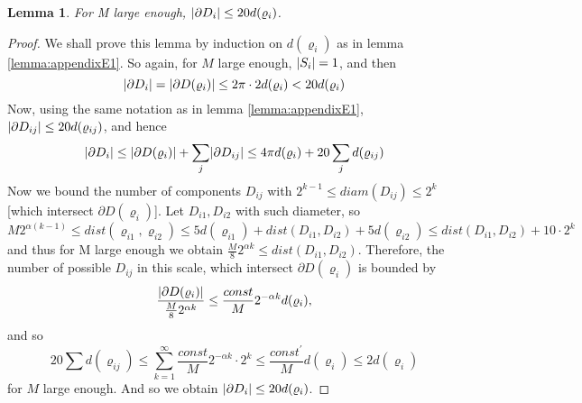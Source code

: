\documentclass[11pt,reqno]{article}
\DeclarePairedDelimiter\abs{\lvert}{\rvert}%
\newtheorem{lemma}[thm]{Lemma}
\theoremstyle{definition}
\numberwithin{equation}{section}
\begin{document}
\begin{lemma} \label{lemma:appendixE2}
For M large enough, $\abs{\partial D_i} \leq 20 d(\varrho_i)$.
\end{lemma}

\begin{proof}
We shall prove this lemma by induction on $d(\varrho_i)$ as in lemma \eqref{lemma:appendixE1}. So again, for $M$ large enough, $\abs{S_i} = 1$, and then
$$
\abs{\partial D_i} = \abs{\partial D(\varrho_i)} \leq 2\pi\cdot 2d(\varrho_i) < 20d(\varrho_i)
$$
Now, using the same notation as in lemma \eqref{lemma:appendixE1}, $\abs{\partial D_{ij}} \leq 20 d(\varrho_{ij})$, and hence
$$
\abs{\partial D_i} \leq \abs{\partial D(\varrho_i)} + \sum_j \abs{\partial D_{ij}} \leq
4\pi d(\varrho_i) + 20 \sum_j d(\varrho_{ij})
$$
Now we bound the number of components $D_{ij}$ with $2^{k-1} \leq diam(D_{ij}) \leq 2^k$ [which intersect $\partial D(\varrho_i)$]. Let $D_{i1}, D_{i2}$ with such diameter, so
$$
M2^{\alpha(k-1)} \leq dist(\varrho_{i1}, \varrho_{i2}) \leq 5d(\varrho_{i1}) + dist(D_{i1}, D_{i2}) + 5d(\varrho_{i2}) \leq dist(D_{i1}, D_{i2}) + 10 \cdot 2^k
$$
and thus for M large enough we obtain $\frac{M}{8}2^{\alpha k} \leq dist(D_{i1}, D_{i2})$. Therefore, the number of possible $D_{ij}$ in this scale, which intersect $\partial D(\varrho_i)$ is bounded by
$$
\frac{\abs{\partial D(\varrho_i)}}{\frac{M}{8}2^{\alpha k}} \leq \frac{const}{M} 2^{-\alpha k} d(\varrho_i),
$$
and so
$$
20 \sum d(\varrho_{ij}) \leq \sum_{k=1}^\infty \frac{const}{M} 2^{-\alpha k} \cdot 2^k \leq \frac{const^\prime}{M} d(\varrho_i) \leq 2d(\varrho_i)
$$
for $M$ large enough. And so we obtain $\abs{\partial D_i} \leq 20d(\varrho_i)$.
\end{proof}
\end{document}
